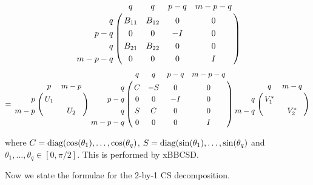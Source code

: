 \begin{enumerate}
\begin{eqnarray*}
            \bordermatrix{            &       q      &      q      &  p-q  & m-p-q \cr
                              \hfill     q    &   B_{11} & B_{12} &    0   &      0    \cr 
                              \hfill   p-q  &    0          & 0          &   -I    &      0   \cr 
                              \hfill     q    &  B_{21}  & B_{22} &    0   &      0   \cr
                              \hfill m-p-q &  0           & 0           &    0   &      I }
\end{eqnarray*}
\begin{eqnarray*}
     =  \bordermatrix{         &    p     &    m-p   \cr
                              \hfill   p   & U_{1} &             \cr
                              \hfill m-p &            & U_{2}  }
            \bordermatrix{            &   q  &  q   &  p-q  & m-p-q \cr
                              \hfill     q    &   C  & -S  &    0   &      0    \cr 
                              \hfill   p-q   &   0  &  0  &   -I    &      0   \cr 
                              \hfill     q    &   S  &  C  &    0   &      0   \cr
                              \hfill m-p-q &   0  &  0  &    0   &      I }
           \bordermatrix{        &     q           &    m-q   \cr
                              \hfill   q   & V_{1}^* &                 \cr
                              \hfill m-q &                & V_{2}^*  }
 \end{eqnarray*}

where $C = {\rm diag}(\cos(\theta_{1}), \ldots , \cos(\theta_{q}) $,
$S = {\rm diag}(\sin(\theta_{1}), \ldots , \sin(\theta_{q}) $ and
 $\theta_{1}, \ldots , \theta_{q} \in [0,\pi/2]$.
This is performed by xBBCSD.

\end{enumerate}

Now we state the formulae for the 2-by-1 CS decomposition.

